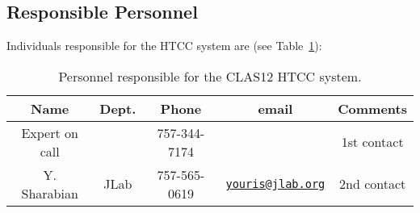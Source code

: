 \subsection{Responsible Personnel}

Individuals responsible for the HTCC system are (see Table~\ref{tb:htcc}):

\begin{table}[!htb]
\centering
\begin{tabular}{|c|c|c|c|c|} \hline
Name          & Dept.& Phone        & email &Comments \\ \hline
Expert on call&      & 757-344-7174 &       & 1st contact \\ \hline
Y. Sharabian  & JLab & 757-565-0619 &\href{mailto:youris@jlab.org}{\nolinkurl{youris@jlab.org}}&2nd contact \\ \hline
\end{tabular}
\caption{Personnel responsible for the CLAS12 HTCC system.} 
\label{tb:htcc}
\end{table}

